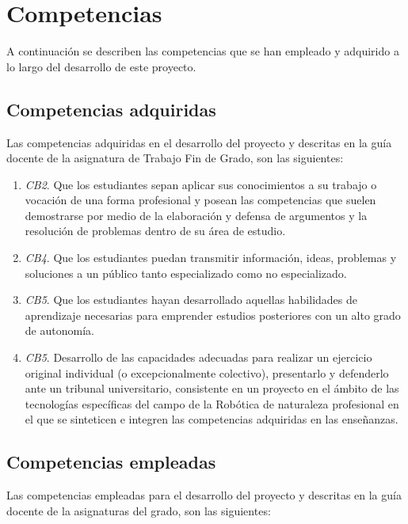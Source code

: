 \section{Competencias}
\label{sec:competencias}

A continuación se describen las competencias que se han empleado y adquirido a lo largo del desarrollo de este proyecto.

\vspace{0.2cm}

\subsection{Competencias adquiridas}

Las competencias adquiridas en el desarrollo del proyecto y descritas en la guía docente de la asignatura de Trabajo Fin de Grado, son las siguientes:

\begin{enumerate}
	\item \textit{CB2}. Que los estudiantes sepan aplicar sus conocimientos a su trabajo o vocación de una forma profesional y posean las competencias que suelen demostrarse por medio de la elaboración y defensa de argumentos y la resolución de problemas dentro de su área de estudio.
	\item \textit{CB4}. Que los estudiantes puedan transmitir información, ideas, problemas y soluciones a un público tanto especializado como no especializado.
	\item \textit{CB5}. Que los estudiantes hayan desarrollado aquellas habilidades de aprendizaje necesarias para emprender estudios posteriores con un alto grado de autonomía.
	\item \textit{CB5}. Desarrollo de las capacidades adecuadas para realizar un ejercicio original individual (o excepcionalmente colectivo), presentarlo y defenderlo ante un tribunal universitario, consistente en un proyecto en el ámbito de las tecnologías específicas del campo de la Robótica de naturaleza profesional en el que se sinteticen e integren las competencias adquiridas en las enseñanzas.
\end{enumerate}


\subsection{Competencias empleadas}
Las competencias empleadas para el desarrollo del proyecto y descritas en la guía docente de la asignaturas del grado, son las siguientes:

